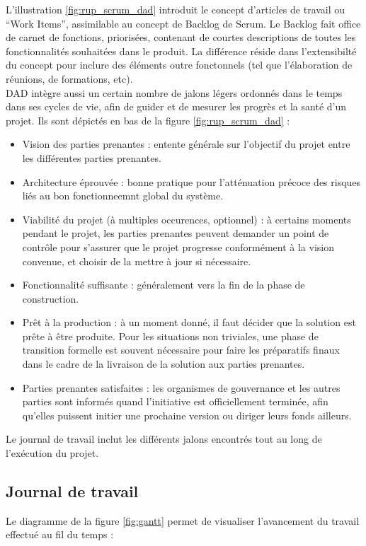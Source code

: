 \begin{spacing}{1.5}
L'illustration \ref{fig:rup_scrum_dad} introduit le concept d'articles de travail ou “Work Items”, assimilable au concept de Backlog de Scrum. Le Backlog fait office de carnet de fonctions, priorisées, contenant de courtes descriptions de toutes les fonctionnalités souhaitées dans le produit. La différence réside dans l'extensibilté du concept pour inclure des éléments outre fonctonnels (tel que l'élaboration de réunions, de formations, etc).\\
DAD intègre aussi un certain nombre de jalons légers ordonnés dans le temps dans ses cycles de vie, afin de guider et de mesurer les progrès et la santé d'un projet. Ils sont dépictés en bas de la figure \ref{fig:rup_scrum_dad} :
\begin{itemize}
    \item Vision des parties prenantes : entente générale sur l'objectif du projet entre les différentes parties prenantes.
    \item Architecture éprouvée : bonne pratique pour l'atténuation précoce des risques liés au bon fonctionneemnt global du système.
    \item Viabilité du projet (à multiples occurences, optionnel) :  à certains moments pendant le projet, les parties prenantes peuvent demander un point de contrôle pour s'assurer que le projet progresse conformément à la vision convenue, et choisir de la mettre à jour si nécessaire.
    \item Fonctionnalité suffisante : généralement vers la fin de la phase de construction.
    \item Prêt à la production : à un moment donné, il faut décider que la solution est prête à être produite. Pour les situations non triviales, une phase de transition formelle est souvent nécessaire pour faire les préparatifs finaux dans le cadre de la livraison de la solution aux parties prenantes.
    \item Parties prenantes satisfaites : les organismes de gouvernance et les autres parties sont informés quand l'initiative est officiellement terminée, afin qu'elles puissent initier une prochaine version ou diriger leurs fonds ailleurs.
\end{itemize}
Le journal de travail inclut les différents jalons encontrés tout au long de l'exécution du projet.

\subsection{Journal de travail}
Le diagramme de la figure \ref{fig:gantt} permet de visualiser l'avancement du travail effectué au fil du temps :


\end{spacing}
